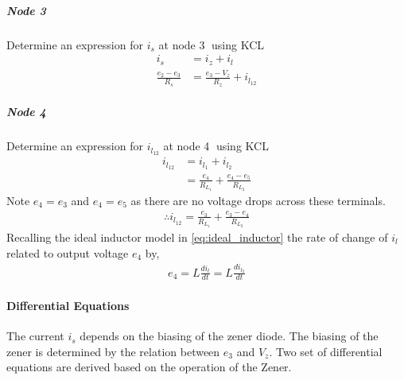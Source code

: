 \subparagraph{Node \textcircled{3}}
Determine an expression for $i_s$ at node \textcircled{3} using KCL
\begin{equation}
	\begin{split}
		i_s &= i_z + i_{l} \\
		\frac{e_2 - e_3}{R_s} &= \frac{e_3 - V_z}{R_z} + i_{l_{12}}
	\end{split}
	\label{eq:fullLoad_node3}
\end{equation}

\subparagraph{Node \textcircled{4}}
Determine an expression for $i_{l_{12}}$ at node \textcircled{4} using KCL
\begin{equation}
	\begin{split}
		i_{l_{12}} &= i_{l_1} + i_{l_2} \\
		    &= \frac{e_4}{R_{L_1}} + \frac{e_4 - e_5}{R_{L_2}}
	\end{split}
\end{equation}
Note $e_4 = e_3$ and $e_4 = e_5$ as there are no voltage drops across these terminals.
\begin{equation}
	\begin{split}
	 \therefore i_{l_{12}} = \frac{e_3}{R_{L_1}} + \frac{e_3 - e_4}{R_{L_2}}
	\end{split}
	\label{eq:fullLoad_node4}
\end{equation}
Recalling the ideal inductor model in \eqref{eq:ideal_inductor} the rate of change of $i_{l}$ related to output voltage $e_4$ by,
\begin{equation}
	\begin{split}
		e_4 = L\frac{di_l}{dt} = L\frac{di_{l_2}}{dt}
	\end{split}
	\label{eq:fullLoad_output}
\end{equation}

\paragraph{Differential Equations}
The current $i_s$ depends on the biasing of the zener diode. The biasing of the zener is determined by the relation between $e_3$ and $V_z$. Two set of differential equations are derived based on the operation of the Zener.

